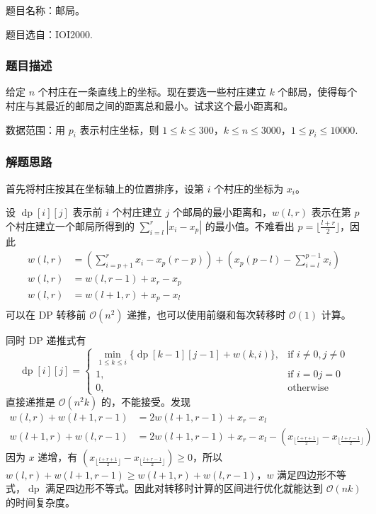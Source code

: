 题目名称：邮局。

题目选自：IOI2000.

\subsubsection{题目描述}

给定 \(n\) 个村庄在一条直线上的坐标。现在要选一些村庄建立 \(k\)
个邮局，使得每个村庄与其最近的邮局之间的距离总和最小。试求这个最小距离和。

数据范围：用 \(p_i\) 表示村庄坐标，则
\(1\le k\le 300\)，\(k\le n\le 3000\)，\(1 \le p_i\le 10000\).

\subsubsection{解题思路}

首先将村庄按其在坐标轴上的位置排序，设第 \(i\) 个村庄的坐标为 \(x_i\)。

设 \(\operatorname{dp}[i][j]\) 表示前 \(i\) 个村庄建立 \(j\)
个邮局的最小距离和，\(w(l,r)\) 表示在第 \(p\) 个村庄建立一个邮局所得到的
\(\sum_{i=l}^r|x_i-x_p|\) 的最小值。不难看出
\(p=\lfloor \frac{l+r}{2}\rfloor\)，因此 \[
\begin{aligned}
w(l,r)&=(\sum_{i=p+1}^rx_i-x_p(r-p))+(x_p(p-l)-\sum_{i=l}^{p-1}x_i)\\
w(l,r)&=w(l,r-1)+x_r-x_p\\
w(l,r)&=w(l+1,r)+x_p-x_l\\
\end{aligned}
\] 可以在 DP 转移前 \(\mathcal{O}(n^2)\)
递推，也可以使用前缀和每次转移时 \(\mathcal{O}(1)\) 计算。

同时 DP 递推式有 \[
\operatorname{dp}[i][j]=
\left\{
\begin{array}{ll}
\min\limits_{1\le k\le i}\{\operatorname{dp}[k-1][j-1]+w(k,i)\},&\text{if } i\neq0,j\neq0\\
1,&\text{if }i=0 j=0\\
0,&\text{otherwise}
\end{array}
\right.
\] 直接递推是 \(\mathcal{O}(n^2k)\) 的，不能接受。发现 \[
\begin{aligned}
w(l,r)+w(l+1,r-1)&=2w(l+1,r-1)+x_r-x_l\\
w(l+1,r)+w(l,r-1)&=2w(l+1,r-1)+x_r-x_l-(x_{\lfloor \frac{l+r+1}{2}\rfloor}-x_{\lfloor \frac{l+r-1}{2}\rfloor})
\end{aligned}
\] 因为 \(x\) 递增，有
\((x_{\lfloor \frac{l+r+1}{2}\rfloor}-x_{\lfloor \frac{l+r-1}{2}\rfloor})\ge0\)，所以
\(w(l,r)+w(l+1,r-1)\ge w(l+1,r)+w(l,r-1)\)，\(w\)
满足四边形不等式，\(\operatorname{dp}\)
满足四边形不等式。因此对转移时计算的区间进行优化就能达到
\(\mathcal{O}(nk)\) 的时间复杂度。


